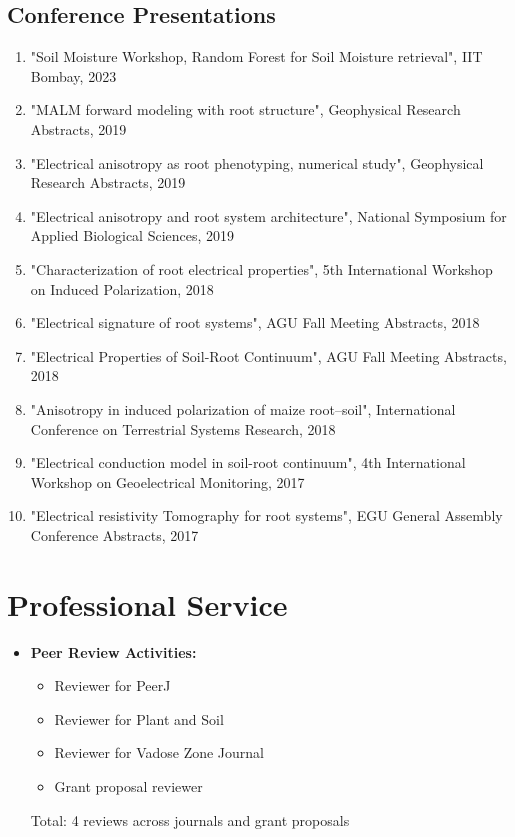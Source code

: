 \documentclass[11pt,a4paper]{article}
\begin{document}
\subsection*{Conference Presentations}
\begin{enumerate}[leftmargin=*]
    \item "Soil Moisture Workshop, Random Forest for Soil Moisture retrieval", IIT Bombay, 2023
    \item "MALM forward modeling with root structure", Geophysical Research Abstracts, 2019
    \item "Electrical anisotropy as root phenotyping, numerical study", Geophysical Research Abstracts, 2019
    \item "Electrical anisotropy and root system architecture", National Symposium for Applied Biological Sciences, 2019
    \item "Characterization of root electrical properties", 5th International Workshop on Induced Polarization, 2018
    \item "Electrical signature of root systems", AGU Fall Meeting Abstracts, 2018
    \item "Electrical Properties of Soil-Root Continuum", AGU Fall Meeting Abstracts, 2018
    \item "Anisotropy in induced polarization of maize root--soil", International Conference on Terrestrial Systems Research, 2018
    \item "Electrical conduction model in soil-root continuum", 4th International Workshop on Geoelectrical Monitoring, 2017
    \item "Electrical resistivity Tomography for root systems", EGU General Assembly Conference Abstracts, 2017
\end{enumerate}

\section*{Professional Service}
\begin{itemize}[leftmargin=*]
    \item \textbf{Peer Review Activities:}
        \begin{itemize}
            \item Reviewer for PeerJ
            \item Reviewer for Plant and Soil
            \item Reviewer for Vadose Zone Journal
            \item Grant proposal reviewer
        \end{itemize}
    Total: 4 reviews across journals and grant proposals
\end{itemize}
\end{document}
